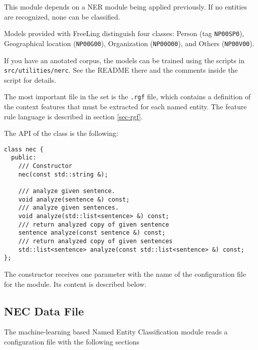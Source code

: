 \documentclass[a4paper]{book}
\begin{document}
  This module depends on a NER module being applied previously. If no
  entities are recognized, none can be classified.

  Models provided with FreeLing distinguish four classes: Person (tag
  {\tt NP00SP0}), Geographical location ({\tt NP00G00}), Organization
  ({\tt NP00O00}), and Others ({\tt NP00V00}).

  If you have an anotated corpus, the models can be trained using the
  scripts in {\tt src/utilities/nerc}.  See the README there and the comments
  inside the script for details.

  The most important file in the set is the {\tt .rgf} file, which contains
  a definition of the context features that must be extracted for each
  named entity.  
  The feature rule language is described in section \ref{sec-rgf}.

  The API of the class is the following:
\begin{verbatim}
class nec {
  public:
    /// Constructor
    nec(const std::string &); 

    /// analyze given sentence.
    void analyze(sentence &) const;
    /// analyze given sentences.
    void analyze(std::list<sentence> &) const;
    /// return analyzed copy of given sentence
    sentence analyze(const sentence &) const;
    /// return analyzed copy of given sentences
    std::list<sentence> analyze(const std::list<sentence> &) const;
};
\end{verbatim}

  The constructor receives one parameter with the name of the configuration file for the module. 
  Its content is described below.

\subsection{NEC Data File}

  The machine-learning based Named Entity Classification module reads a configuration file with
 the following sections
\end{document}

